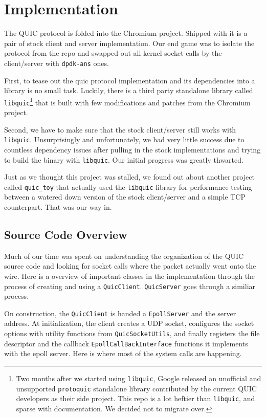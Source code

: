 \documentclass{sig-alternate-05-2015}
\begin{document}
\section{Implementation}
The QUIC protocol is folded into the Chromium project. Shipped with it is a pair of stock client and server implementation. Our end game was to isolate the protocol from the repo and swapped out all kernel socket calls by the client/server with \texttt{dpdk-ans} ones. 
 
First, to tease out the quic protocol implementation and its dependencies into a library is no small task. Luckily, there is a third party standalone library called \texttt{libquic}\footnote{Two months after we started using \texttt{libquic}, Google released an unofficial and unsupported \texttt{protoquic} standalone library contributed by the current QUIC developers as their side project. This repo is a lot heftier than \texttt{libquic}, and sparse with documentation. We decided not to migrate over.} that is built with few modifications and patches from the Chromium project. 

Second, we have to make sure that the stock client/server still works with \texttt{libquic}. Unsurprisingly and unfortunately, we had very little success due to countless dependency issues after pulling in the stock implementations and trying to build the binary with \texttt{libquic}. Our initial progress was greatly thwarted. 

Just as we thought this project was stalled, we found out about another project called \texttt{quic\_toy} that actually used the \texttt{libquic} library for performance testing between a watered down version of the stock client/server and a simple TCP counterpart. That was our way in. 

\subsection{Source Code Overview}
Much of our time was spent on understanding the organization of the QUIC source code and looking for socket calls where the packet actually went onto the wire. Here is a overview of important classes in the implementation through the process of creating and using a \texttt{QuicClient}. \texttt{QuicServer} goes through a similiar process.

On construction, the \texttt{QuicClient} is handed a \texttt{EpollServer} and the server address. At initialization, the client creates a UDP socket, configures the socket options with utility functions from \texttt{QuicSocketUtils}, and finally registers the file descriptor and the callback \texttt{EpollCallBackInterface} functions it implements with the epoll server. Here is where most of the system calls are happening. 
\end{document}
